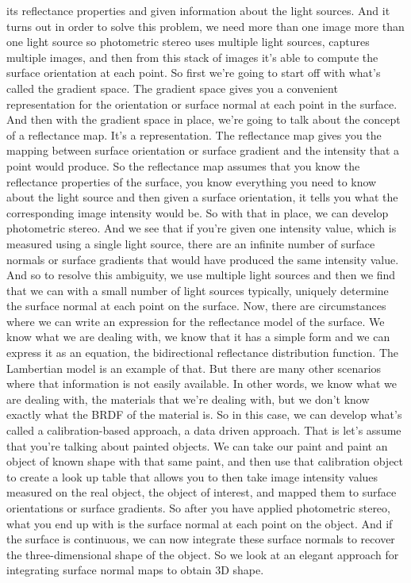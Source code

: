 \documentclass[12pt]{article}
\begin{document}
its reflectance properties and given information
about the light sources.
And it turns out in order to solve this problem,
we need more than one image more than one light source
so photometric stereo uses multiple light sources,
captures multiple images, and then from this stack of images
it's able to compute the surface orientation at each point.
So first we're going to start off with what's
called the gradient space.
The gradient space gives you a convenient representation
for the orientation or surface normal at each point
in the surface.
And then with the gradient space in place,
we're going to talk about the concept of a reflectance map.
It's a representation.
The reflectance map gives you the mapping
between surface orientation or surface
gradient and the intensity that a point would produce.
So the reflectance map assumes that you know the reflectance properties
of the surface, you know everything
you need to know about the light source
and then given a surface orientation,
it tells you what the corresponding image
intensity would be.
So with that in place, we can develop photometric stereo.
And we see that if you're given one intensity value, which
is measured using a single light source,
there are an infinite number of surface normals or surface
gradients that would have produced the same intensity
value.
And so to resolve this ambiguity,
we use multiple light sources and then
we find that we can with a small number of light sources
typically, uniquely determine the surface
normal at each point on the surface.
Now, there are circumstances where
we can write an expression for the reflectance model
of the surface.
We know what we are dealing with, we
know that it has a simple form and we can express it
as an equation, the bidirectional reflectance
distribution function.
The Lambertian model is an example of that.
But there are many other scenarios
where that information is not easily available.
In other words, we know what we are dealing with,
the materials that we're dealing with,
but we don't know exactly what the BRDF of the material
is.
So in this case, we can develop what's
called a calibration-based approach, a data driven
approach.
That is let's assume that you're talking about painted objects.
We can take our paint and paint an object
of known shape with that same paint,
and then use that calibration object
to create a look up table that allows you to then take
image intensity values measured
on the real object, the object of interest,
and mapped them to surface orientations or surface
gradients.
So after you have applied photometric stereo, what
you end up with is the surface normal at each point
on the object.
And if the surface is continuous,
we can now integrate these surface normals
to recover the three-dimensional shape of the object.
So we look at an elegant approach
for integrating surface normal maps to obtain 3D shape.
\end{document}
